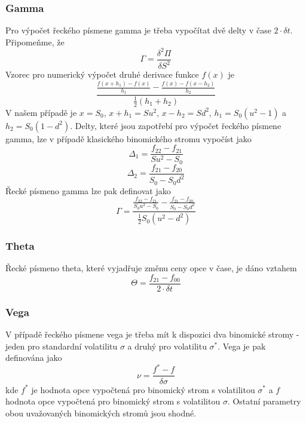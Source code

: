 \documentclass[a4paper]{book}
\begin{document}
\subsubsection{Gamma}

Pro výpočet řeckého písmene gamma je třeba vypočítat dvě delty v čase $2 \cdot \delta t$. Připomeňme, že
\begin{equation*}
\Gamma = \frac{\delta^2 \Pi}{\delta S^2}
\end{equation*}
Vzorec pro numerický výpočet druhé derivace funkce $f(x)$ je
\begin{equation*}
\frac{\frac{f(x+h_1)-f(x)}{h_1}-\frac{f(x)-f(x-h_2)}{h_2}}{\frac{1}{2}(h_1 + h_2)}
\end{equation*}
V našem případě je $x = S_0$, $x+h_1 = Su^2$, $x-h_2 = Sd^2$, $h_1 = S_0(u^2-1)$ a $h_2=S_0(1-d^2)$. Delty, které jsou zapotřebí pro výpočet řeckého písmene gamma, lze v případě klasického binomického stromu vypočíst jako
\begin{equation*}
\Delta_1 = \frac{f_{22}-f_{21}}{Su^2 - S_0}
\end{equation*}
\begin{equation*}
\Delta_2 = \frac{f_{21}-f_{20}}{S_0 - S_0d^2}
\end{equation*}
Řecké písmeno gamma lze pak definovat jako
\begin{equation*}
\Gamma = \frac{\frac{f_{22}-f_{21}}{S_0u^2-S_0}-\frac{f_{21}-f_{20}}{S_0-S_0d^2}}{\frac{1}{2}S_0(u^2-d^2)}
\end{equation*}

\subsubsection{Theta}

Řecké písmeno theta, které vyjadřuje změnu ceny opce v čase, je dáno vztahem
\begin{equation*}
\Theta = \frac{f_{21}-f_{00}}{2 \cdot \delta t}
\end{equation*}

\subsubsection{Vega}

V případě řeckého písmene vega je třeba mít k dispozici dva binomické stromy - jeden pro standardní volatilitu $\sigma$ a druhý pro volatilitu $\sigma^*$. Vega je pak definována jako
\begin{equation*}
\nu = \frac{f^* - f}{\delta \sigma}
\end{equation*}
kde $f^*$ je hodnota opce vypočtená pro binomický strom s volatilitou $\sigma^*$ a $f$ hodnota opce vypočtená pro binomický strom s volatilitou $\sigma$. Ostatní parametry obou uvažovaných binomických stromů jsou shodné.
\end{document}
